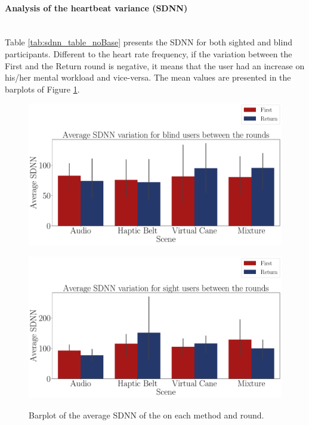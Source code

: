 \paragraph{Analysis of the heartbeat variance (SDNN)}\mbox{}\\
%

Table \ref{tab:sdnn_table_noBase} presents the SDNN for both sighted and blind participants. Different to the heart rate frequency, if the variation between the First and the Return round is negative, it means that the user had an increase on his/her mental workload and vice-versa. The mean values are presented in the barplots of Figure \ref{fig:barplot_ecg_sdnn_4_scene_blind_sight}.



\begin{figure}[!htpb]
    \centering
    \begin{minipage}{\textwidth}
        \centering
        \includegraphics[width = \textwidth]{Resultados/ECG/Figuras/pdf/barplot_ecg_sdnn_4_scene_blind.pdf}
        \label{fig:barplot_ecg_sdnn_4_scene_blind}
    \end{minipage}
    \begin{minipage}{\textwidth}
        \centering
        \includegraphics[width = \textwidth]{Resultados/ECG/Figuras/pdf/barplot_ecg_sdnn_4_scene_sight.pdf}
        \label{fig:barplot_ecg_sdnn_4_scene_sight}
    \end{minipage}
    \caption{Barplot of the average SDNN of the on each method and round.}
    \label{fig:barplot_ecg_sdnn_4_scene_blind_sight}
\end{figure}
